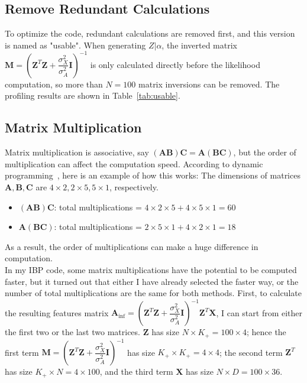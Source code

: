 \subsection{Remove Redundant Calculations}
\label{sub:usable}
To optimize the code, redundant calculations are removed first, and this version is named as "usable". When generating $Z|\alpha$, the inverted matrix $\mathbf{M} = (\mathbf{Z}^T\mathbf{Z}+\dfrac{\sigma_X^2}{\sigma_A^2}\mathbf{I})^{-1}$ is only calculated directly before the likelihood computation, so more than $N = 100$ matrix inversions can be removed. The profiling results are shown in Table~\ref{tab:usable}. 

\subsection{Matrix Multiplication}
Matrix multiplication is associative, say $(\mathbf{A}\mathbf{B})\mathbf{C} = \mathbf{A}(\mathbf{B}\mathbf{C})$, but the order of multiplication can affect the computation speed. According to dynamic programming~\cite{matrixmult}, here is an example of how this works: The dimensions of matrices $\mathbf{A},\mathbf{B},\mathbf{C}$ are $4 \times 2,2 \times 5, 5 \times 1$, respectively.
\begin{itemize}
\item $(\mathbf{A}\mathbf{B})\mathbf{C}$: total multiplications = $4 \times 2 \times 5 + 4 \times 5 \times 1 = 60$
\item $\mathbf{A}(\mathbf{B}\mathbf{C})$: total multiplications = $2 \times 5 \times 1 + 4 \times 2 \times 1 = 18$
\end{itemize}
As a result, the order of multiplications can make a huge difference in computation.\\

In my IBP code, some matrix multiplications have the potential to be computed faster, but it turned out that either I have already selected the faster way, or the number of total multiplications are the same for both methods. First, to calculate the resulting features matrix $\mathbf{A}_{\text{inf}} = (\mathbf{Z}^T\mathbf{Z}+\dfrac{\sigma_X^2}{\sigma_A^2}\mathbf{I})^{-1}\mathbf{Z}^T \mathbf{X}$, I can start from either the first two or the last two matrices. $\mathbf{Z}$ has size $N \times K_+ = 100 \times 4$; hence the first term $\mathbf{M} = (\mathbf{Z}^T\mathbf{Z}+\dfrac{\sigma_X^2}{\sigma_A^2}\mathbf{I})^{-1}$ has size $K_+ \times K_+ = 4 \times 4$; the second term $\mathbf{Z}^T$ has size $K_+ \times N = 4 \times 100$, and the third term $\mathbf{X}$ has size $N \times D = 100 \times 36$.

